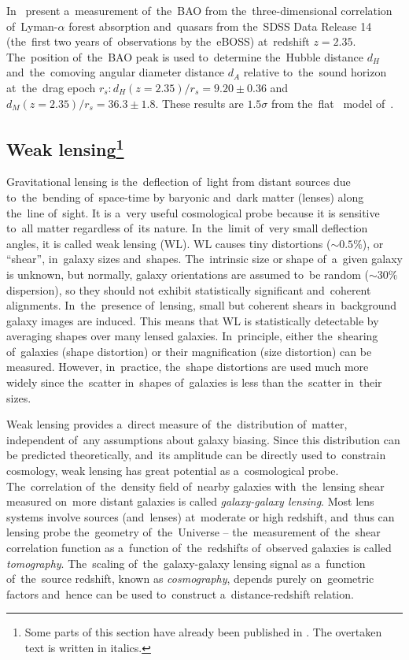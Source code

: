In~\textcite{BAO_results} present a~measurement of~the~BAO from the~three-dimensional correlation of~Lyman-$\alpha$ forest absorption and~quasars from the~SDSS Data Release 14 (the~first two years of~observations by the~eBOSS) at~redshift $z=2.35$. The~position of~the~BAO peak is used to~determine the~Hubble distance $d_H$ and~the~comoving angular diameter distance $d_A$ relative to~the~sound horizon at~the~drag epoch $r_s: d_H(z=2.35)/r_s = 9.20\pm0.36$ and~$d_M(z=2.35)/r_s = 36.3\pm1.8$. These results are $1.5\sigma$ from the~flat \LCDM\ model of~\textcite{2016A&A...594A..13P}.
\subsection[Weak lensing]{Weak lensing\footnote{Some parts of this section have already been published in \textcite{mastersthesis_vrastil}. The overtaken text is written in italics.}}
\label{ssec:wl}
Gravitational lensing is the~deflection of~light from distant sources due to~the~bending of~space-time by baryonic and~dark matter (lenses) along the~line of~sight. It is a~very useful cosmological probe because it is sensitive to~all matter regardless of~its nature. In~the~limit of~very small deflection angles, it is called weak lensing (WL). WL causes tiny distortions ($\sim0.5\%$), or ``shear'', in~galaxy sizes and~shapes. The~intrinsic size or shape of~a~given galaxy is unknown, but normally, galaxy orientations are assumed to~be random ($\sim30\%$ dispersion), so they should not exhibit statistically significant and~coherent alignments. In~the~presence of~lensing, small but coherent shears in~background galaxy images are induced. This means that WL is statistically detectable by averaging shapes over many lensed galaxies. In~principle, either the~shearing of~galaxies (shape distortion) or their magnification (size distortion) can be measured. However, in~practice, the~shape distortions are used much more widely since the~scatter in~shapes of~galaxies is less than the~scatter in~their sizes.

Weak lensing provides a~direct measure of~the~distribution of~matter, independent of~any assumptions about galaxy biasing. Since this distribution can be predicted theoretically, and~its amplitude can be directly used to~constrain cosmology, weak lensing has great potential as a~cosmological probe. The~correlation of~the~density field of~nearby galaxies with~the~lensing shear measured on~more distant galaxies is called \textit{galaxy-galaxy lensing}. Most lens systems involve sources (and~lenses) at~moderate or high redshift, and~thus can lensing probe the~geometry of~the~Universe -- the~measurement of~the~shear correlation function as a~function of~the~redshifts of~observed galaxies is called \textit{tomography}. The~scaling of~the~galaxy-galaxy lensing signal as a~function of~the~source redshift, known as \textit{cosmography}, depends purely on~geometric factors and~hence can be used to~construct a~distance-redshift relation.
